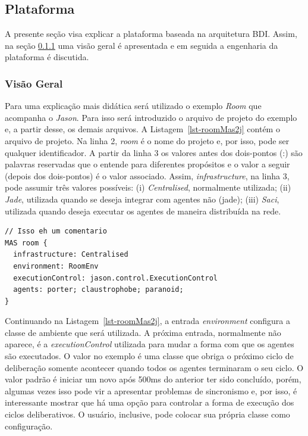 \subsection{Plataforma \jason} \label{sec:aoppj}

A presente seção visa explicar a plataforma \jason baseada na arquitetura BDI.
Assim, na seção \ref{sec-jason-overview} uma visão geral é apresentada e em
seguida a engenharia da plataforma é discutida.

\subsubsection{Visão Geral} \label{sec-jason-overview}

Para uma explicação mais didática será utilizado o exemplo \emph{Room} que
acompanha o \emph{Jason}. Para isso será introduzido
o arquivo de projeto do exemplo e, a partir desse, os demais arquivos.
A Listagem~\ref{lst-roomMas2j} contém o arquivo de projeto.
Na linha 2, \emph{room} é o nome do projeto e, por isso, pode ser qualquer
identificador. A partir da linha 3 os valores antes dos dois-pontos (:)
são palavras reservadas que o \jason entende para diferentes propósitos e o valor
a seguir (depois dos dois-pontos) é o valor associado.
Assim, \emph{infrastructure}, na linha 3, pode assumir três valores
possíveis: (i) \emph{Centralised}, normalmente utilizada;
(ii) \emph{Jade}, utilizada quando se deseja integrar
com agentes não \jason (jade); (iii) \emph{Saci}, utilizada
quando deseja executar os agentes de maneira distribuída na rede.

\begin{center}
    \begin{minipage}{120mm}
	\lstset{linewidth=120mm}
	\begin{lstlisting}[frame=trbl, caption=Arquivo de projeto do \jason para o exemplo \emph{Room}, label=lst-roomMas2j]
// Isso eh um comentario
MAS room {
  infrastructure: Centralised
  environment: RoomEnv
  executionControl: jason.control.ExecutionControl
  agents: porter; claustrophobe; paranoid;
}
	\end{lstlisting}
    \end{minipage}
\end{center}

Continuando na Listagem~\ref{lst-roomMas2j}, a entrada \emph{environment}
configura a classe de ambiente que será utilizada. A próxima entrada,
normalmente não aparece, é a \emph{executionControl} utilizada para
mudar a forma com que os agentes são executados. O valor no exemplo é uma
classe que obriga o próximo ciclo de deliberação somente acontecer quando
todos os agentes terminaram o seu ciclo. O valor padrão é iniciar um novo
após 500ms do anterior ter sido concluído, porém, algumas vezes isso
pode vir a apresentar problemas de sincronismo e, por isso, é interessante
mostrar que há uma opção para controlar a forma de execução dos ciclos
deliberativos. O usuário, inclusive, pode colocar sua própria classe como
configuração.

